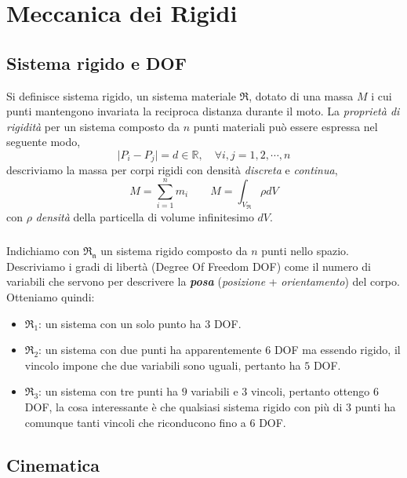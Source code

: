 \chapter{Meccanica dei Rigidi}
\section{Sistema rigido e DOF}
Si definisce sistema rigido, un sistema materiale $\mathfrak{R}$, dotato di una massa $M$ i cui punti mantengono invariata la reciproca distanza durante il moto. La \emph{proprietà di rigidità} per un sistema composto da $n$ punti materiali può essere espressa nel seguente modo,
\begin{equation}
	\vert P_i - P_j\vert = d \in \mathbb{R},\quad \forall i,j = 1,2, \cdots, n
\end{equation}
descriviamo la massa per corpi rigidi con densità \emph{discreta} e \emph{continua},
\begin{equation}
	M = \sum_{i = 1}^{n} m_i  \qquad M = \int_{V_{\mathfrak{R}}} \rho dV
\end{equation}
con $\rho$ \emph{densità} della particella di volume infinitesimo $dV$.

\paragraph{}
Indichiamo con $\mathfrak{R_n}$ un sistema rigido composto da $n$ punti nello spazio. Descriviamo i gradi di libertà (Degree Of Freedom DOF) come il numero di variabili che servono per descrivere la \emph{\textbf{posa}} (\emph{posizione} + \emph{orientamento}) del corpo. Otteniamo quindi:
\begin{itemize}
	\item $\mathfrak{R_1}$: un sistema con un solo punto ha $3$ DOF.
	\item $\mathfrak{R_2}$: un sistema con due punti ha apparentemente $6$ DOF ma essendo rigido, il vincolo impone che due variabili sono uguali, pertanto ha $5$ DOF.
	\item $\mathfrak{R_3}$: un sistema con tre punti ha $9$ variabili e $3$ vincoli, pertanto ottengo $6$ DOF, la cosa interessante è che qualsiasi sistema rigido con più di 3 punti ha comunque tanti vincoli che riconducono fino a $6$ DOF.
\end{itemize}

\section{Cinematica}
